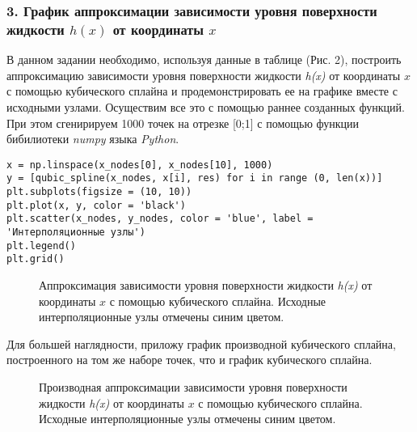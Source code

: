 \subsubsection{3. График аппроксимации зависимости уровня поверхности жидкости $h(x)$
от координаты $x$}
В данном задании необходимо, используя данные в таблице (Рис. 2), построить аппроксимацию зависимости уровня поверхности жидкости \textit{h(x)} от координаты $x$ с помощью кубического сплайна и продемонстрировать ее на графике вместе с исходными узлами.
Осуществим все это с помощью раннее созданных функций. При этом сгенирируем 1000 точек на отрезке [0;1] с помощью функции бибилиотеки \textit{numpy} языка \textit{Python}.
\begin{lstlisting} 
x = np.linspace(x_nodes[0], x_nodes[10], 1000)
y = [qubic_spline(x_nodes, x[i], res) for i in range (0, len(x))]
plt.subplots(figsize = (10, 10))
plt.plot(x, y, color = 'black')
plt.scatter(x_nodes, y_nodes, color = 'blue', label = 'Интерполяционные узлы')
plt.legend()
plt.grid()
\end{lstlisting} 
\begin{figure}[h]
\caption{Аппроксимация зависимости уровня поверхности жидкости \textit{h(x)} от координаты $x$ с помощью кубического сплайна. Исходные интерполяционные узлы отмечены синим цветом.}
\end{figure}
\clearpage
Для большей наглядности, приложу график производной кубического сплайна, построенного на том же наборе точек, что и график кубического сплайна.
\begin{figure}[h]
\caption{Производная аппроксимации зависимости уровня поверхности жидкости \textit{h(x)} от координаты $x$ с помощью кубического сплайна. Исходные интерполяционные узлы отмечены синим цветом.}
\end{figure}
%
%
%
%
